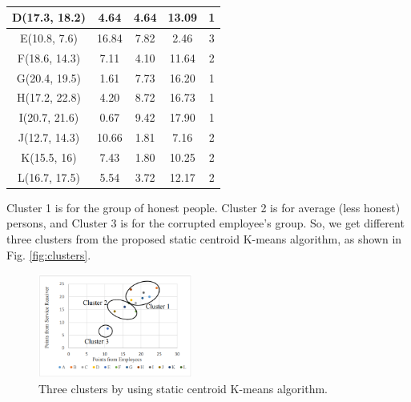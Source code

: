 \documentclass[conference]{IEEEtran}
\begin{document}
\begin{table}[H]
\begin{tabular}{ccccc}
        \multicolumn{1}{|c|}{D(17.3, 18.2)} & \multicolumn{1}{c|}{4.64} & \multicolumn{1}{c|}{4.64} & \multicolumn{1}{c|}{13.09} & \multicolumn{1}{c|}{1} \\ \hline
        \multicolumn{1}{|c|}{E(10.8, 7.6)} & \multicolumn{1}{c|}{16.84} & \multicolumn{1}{c|}{7.82} & \multicolumn{1}{c|}{2.46} & \multicolumn{1}{c|}{3} \\ \hline
        \multicolumn{1}{|c|}{F(18.6, 14.3)} & \multicolumn{1}{c|}{7.11} & \multicolumn{1}{c|}{4.10} & \multicolumn{1}{c|}{11.64} & \multicolumn{1}{c|}{2} \\ \hline
        \multicolumn{1}{|c|}{G(20.4, 19.5)} & \multicolumn{1}{c|}{1.61} & \multicolumn{1}{c|}{7.73} & \multicolumn{1}{c|}{16.20} & \multicolumn{1}{c|}{1} \\ \hline
        \multicolumn{1}{|c|}{H(17.2, 22.8)} & \multicolumn{1}{c|}{4.20} & \multicolumn{1}{c|}{8.72} & \multicolumn{1}{c|}{16.73} & \multicolumn{1}{c|}{1} \\ \hline
        \multicolumn{1}{|c|}{I(20.7, 21.6)} & \multicolumn{1}{c|}{0.67} & \multicolumn{1}{c|}{9.42} & \multicolumn{1}{c|}{17.90} & \multicolumn{1}{c|}{1} \\ \hline
        \multicolumn{1}{|c|}{J(12.7, 14.3)} & \multicolumn{1}{c|}{10.66} & \multicolumn{1}{c|}{1.81} & \multicolumn{1}{c|}{7.16} & \multicolumn{1}{c|}{2} \\ \hline
        \multicolumn{1}{|c|}{K(15.5, 16)} & \multicolumn{1}{c|}{7.43} & \multicolumn{1}{c|}{1.80} & \multicolumn{1}{c|}{10.25} & \multicolumn{1}{c|}{2} \\ \hline
        \multicolumn{1}{|c|}{L(16.7, 17.5)} & \multicolumn{1}{c|}{5.54} & \multicolumn{1}{c|}{3.72} & \multicolumn{1}{c|}{12.17} & \multicolumn{1}{c|}{2} \\ \hline
    \end{tabular}
    \vspace{8pt}
    \caption{}
    \label{tab:distance}
\end{table}

Cluster 1 is for the group of honest people. Cluster 2 is for average (less honest) persons, and Cluster 3 is for the corrupted employee’s group. So, we get different three clusters from the proposed static centroid K-means algorithm, as shown in Fig. \ref{fig:clusters}.

\begin{figure}[H]
    \centering
    \includegraphics[width=0.45\textwidth]{cluster2.png}
    \caption{Three clusters by using static centroid K-means algorithm.}
    \label{fig:cluster2}
\end{figure}
\end{document}
